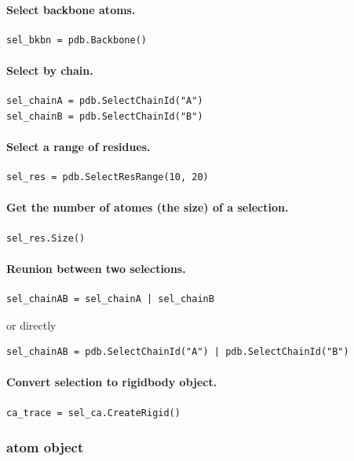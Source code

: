 \documentclass[12pt,a4paper]{article}
\begin{document}
\paragraph{Select backbone atoms.}
\begin{verbatim}
sel_bkbn = pdb.Backbone()
\end{verbatim}


\paragraph{Select by chain.}
\begin{verbatim}
sel_chainA = pdb.SelectChainId("A")
sel_chainB = pdb.SelectChainId("B")
\end{verbatim}


\paragraph{Select a range of residues.}
\begin{verbatim}
sel_res = pdb.SelectResRange(10, 20)
\end{verbatim}


\paragraph{Get the number of atomes (the size) of a selection.}
\begin{verbatim}
sel_res.Size()
\end{verbatim}



\paragraph{Reunion between two selections.}
\begin{verbatim}
sel_chainAB = sel_chainA | sel_chainB
\end{verbatim}
or directly
\begin{verbatim}
sel_chainAB = pdb.SelectChainId("A") | pdb.SelectChainId("B")
\end{verbatim}


\paragraph{Convert selection to rigidbody object.}
\begin{verbatim}
ca_trace = sel_ca.CreateRigid()
\end{verbatim}

\subsubsection{atom object}
\end{document}
